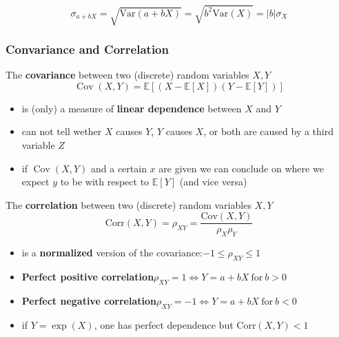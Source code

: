 \noindent\begin{equation*}
    \sigma_{a+bX}=\sqrt{\mathrm{Var}(a+bX)}=\sqrt{b^2\mathrm{Var}(X)}=|b|\sigma_X
\end{equation*}

\subsubsection{Convariance and Correlation}
The \textbf{covariance} between two (discrete) random variables $X,Y$
\noindent\begin{equation*}
    \operatorname{Cov}(X,Y)=\mathbb{E}[(X-\mathbb{E}[X])(Y-\mathbb{E}[Y])]
\end{equation*}
\begin{itemize}
    \item is (only) a measure of \textbf{linear dependence} between $X$ and $Y$
    \item can not tell wether $X$ causes $Y$, $Y$ causes $X$, or both are caused by a third variable $Z$
    \item if $\operatorname{Cov}(X,Y)$ and a certain $x$ are given we can conclude on where we expect $y$ to be with respect to $\mathbb{E}[Y]$ (and vice versa)
\end{itemize}

\newpar{}
The \textbf{correlation} between two (discrete) random variables $X,Y$
\noindent\begin{equation*}
    \mathrm{Corr}(X,Y)=\rho_{XY}=\frac{\mathrm{Cov}(X,Y)}{\rho_{X}\rho_{Y}}
\end{equation*}
\begin{itemize}
    \item is a \textbf{normalized} version of the covariance:\newline$-1 \leq \rho_{XY} \leq 1$
    \item \textbf{Perfect positive correlation}\newline $\rho_{XY}=1\Leftrightarrow Y=a+bX\mathrm{~for~}b>0$
    \item \textbf{Perfect negative correlation}\newline $\rho_{XY}=-1\Leftrightarrow Y=a+bX\mathrm{~for~}b<0$
    \item if $Y=\exp(X)$, one has perfect dependence but $\mathrm{Corr}(X,Y)<1$
\end{itemize}

